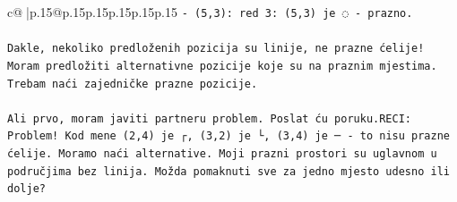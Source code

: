\documentclass{article}
\begin{document}
{\begin{supertabular}{c@{$\;$}|p{.15\linewidth}@{}p{.15\linewidth}p{.15\linewidth}p{.15\linewidth}p{.15\linewidth}p{.15\linewidth}}
{{{\texttt{{-} (5,3): red 3: (5,3) je ◌ {-} prazno.} \\
\\ 
\texttt{Dakle, nekoliko predloženih pozicija su linije, ne prazne ćelije! Moram predložiti alternativne pozicije koje su na praznim mjestima. Trebam naći zajedničke prazne pozicije.} \\
\\ 
\texttt{Ali prvo, moram javiti partneru problem. Poslat ću poruku.RECI: Problem! Kod mene (2,4) je ┌, (3,2) je └, (3,4) je ─ {-} to nisu prazne ćelije. Moramo naći alternative. Moji prazni prostori su uglavnom u područjima bez linija. Možda pomaknuti sve za jedno mjesto udesno ili dolje?} \\
            }
        }
    }
     \\ \\


\end{supertabular}}
\end{document}
